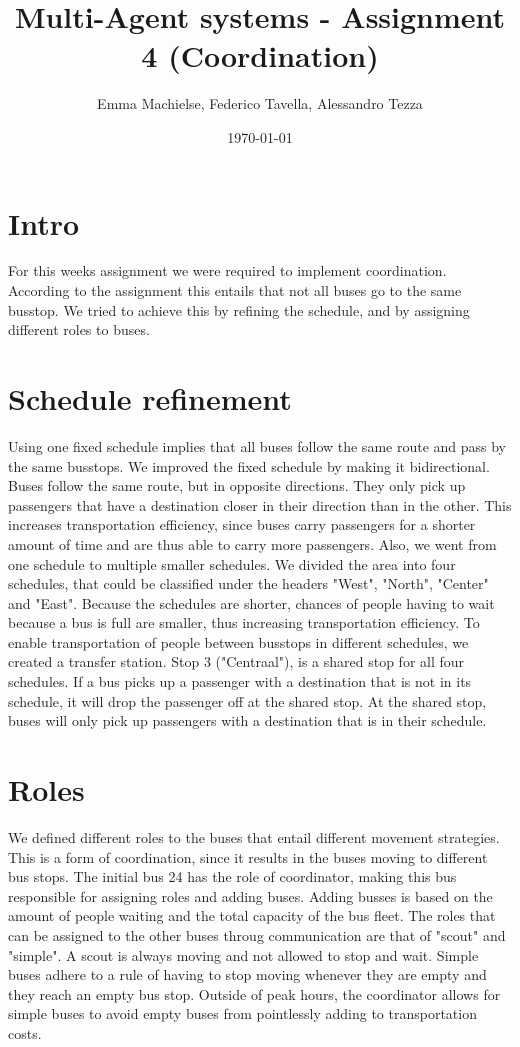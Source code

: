 \documentclass[a4paper]{article}
\title{Multi-Agent systems - Assignment 4 (Coordination)}
\author{Emma Machielse, Federico Tavella, Alessandro Tezza}
\date{\today}
\begin{document}
\Coordination

\section{Intro}
For this weeks assignment we were required to implement coordination. According to the assignment this entails that not all buses go to the same busstop. We tried to achieve this by refining the schedule, and by assigning different roles to buses. 

\section{Schedule refinement}
Using one fixed schedule implies that all buses follow the same route and pass by the same busstops. We improved the fixed schedule by making it bidirectional. Buses follow the same route, but in opposite directions. They only pick up passengers that have a destination closer in their direction than in the other. This increases transportation efficiency, since buses carry passengers for a shorter amount of time and are thus able to carry more passengers. 
\newline
Also, we went from one schedule to multiple smaller schedules. We divided the area into four schedules, that could be classified under the headers "West", "North", "Center" and "East". Because the schedules are shorter, chances of people having to wait because a bus is full are smaller, thus increasing transportation efficiency. To enable transportation of people between busstops in different schedules, we created a transfer station. Stop 3 ("Centraal"), is a shared stop for all four schedules. If a bus picks up a passenger with a destination that is not in its schedule, it will drop the passenger off at the shared stop. At the shared stop, buses will only pick up passengers with a destination that is in their schedule. 

\section{Roles}
We defined different roles to the buses that entail different movement strategies. This is a form of coordination, since it results in the buses moving to different bus stops. The initial bus 24 has the role of coordinator, making this bus responsible for assigning roles and adding buses. Adding busses is based on the amount of people waiting and the total capacity of the bus fleet. The roles that can be assigned to the other buses throug communication are that of "scout" and "simple". A scout is always moving and not allowed to stop and wait. Simple buses adhere to a rule of having to stop moving whenever they are empty and they reach an empty bus stop. Outside of peak hours, the coordinator allows for simple buses to avoid empty buses from pointlessly adding to transportation costs.  
\end{document}
